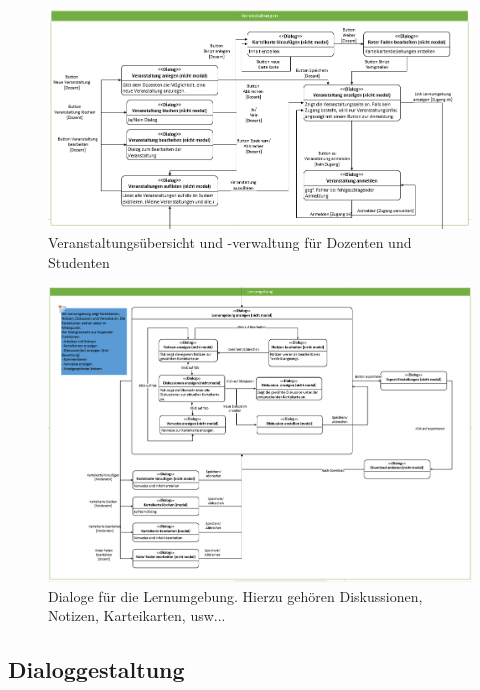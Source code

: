 \documentclass[12pt,a4paper]{article}
\begin{document}
{\begin{landscape}
\begin{figure}[H]
	\centering
	\includegraphics[width=25cm]{Bilder/Mockups/DSDVeranstaltungen.png}
	\caption{Veranstaltungsübersicht und -verwaltung für Dozenten und Studenten}
	\label{DSDVeranstaltung}
\end{figure}

\begin{figure}[H]
	\centering
	\includegraphics[width=25cm]{Bilder/Mockups/DSDLernumgebung.png}
	\caption{Dialoge für die Lernumgebung. Hierzu gehören Diskussionen, Notizen, Karteikarten, usw...}
	\label{DSDLernumgebung}
\end{figure}

\end{landscape}
\subsection{Dialoggestaltung}

\begin{figure}[H]
	\centering

\end{figure}}
\end{document}
